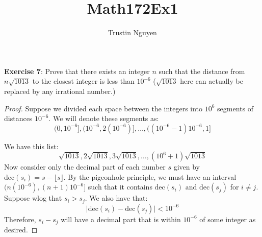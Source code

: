 \documentclass{article}
\title{Math172Ex1}
\author{Trustin Nguyen}
\begin{document}
\begin{titlepage}
    \maketitle
\end{titlepage}

\reversemarginpar

\textbf{Exercise 7}: Prove that there exists an integer $n$ such that the distance from $n\sqrt{1013}$ to the closest integer is less than $10^{-6}$ ($\sqrt{1013}$ here can actually be replaced by any irrational number.)
    \begin{proof}
        Suppose we divided each space between the integers into $10^{6}$ segments of distances $10^{-6}$. We will denote these segments as:
            \begin{equation*}
                (0, 10^{-6}], (10^{-6}, 2(10^{-6})], \ldots, ((10^{-6} - 1)10^{-6}, 1]
            \end{equation*}

        We have this list:
            \begin{equation*}
                \sqrt{1013}, 2\sqrt{1013}, 3\sqrt{1013}, \ldots, (10^{6} + 1)\sqrt{1013}
            \end{equation*}
        Now consider only the decimal part of each number $s$ given by $\text{dec}(s_{i}) = s - \lfloor s \rfloor$. By the pigeonhole principle, we must have an interval $(n(10^{-6}), (n + 1)10^{-6}]$ such that it contains $\text{dec}(s_{i}) \text{ and } \text{dec}(s_{j})$ for $i \neq j$. Suppose wlog that $s_{i} >  s_{j}$. We also have that:
        \begin{equation*}
            \lvert \text{dec}(s_{i}) - \text{dec}(s_{j}) \rvert < 10^{-6}
        \end{equation*}         
        Therefore, $s_{i} - s_{j}$ will have a decimal part that is within $10^{-6}$ of some integer as desired.
    \end{proof}
\end{document}
